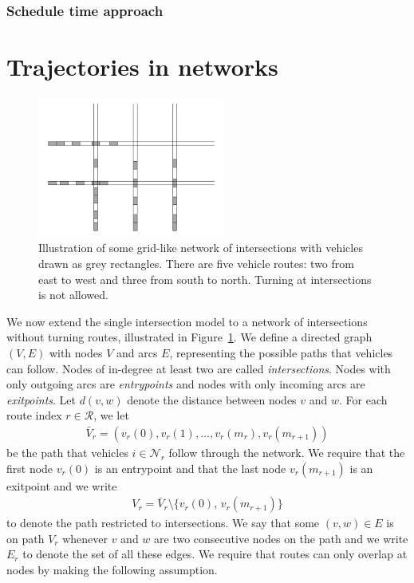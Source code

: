 \documentclass[a4paper]{article}
\theoremstyle{definition}
\theoremstyle{plain}
\begin{document}

\subsubsection{Schedule time approach}

\newpage
\section{Trajectories in networks}

\begin{figure}
  \centering
  \includegraphics[width=0.55\textwidth]{figures/network/grid_example.png}
  \caption{Illustration of some grid-like network of intersections with vehicles
    drawn as grey rectangles. There are five vehicle routes: two from east to
    west and three from south to north. Turning at intersections is not
    allowed.}\label{fig:network_illustration}
\end{figure}

We now extend the single intersection model to a network of intersections
without turning routes, illustrated in Figure~\ref{fig:network_illustration}.
We define a directed graph $(V,E)$ with nodes $V$ and arcs $E$, representing the
possible paths that vehicles can follow. Nodes of in-degree at least two are
called \textit{intersections}. Nodes with only outgoing arcs are
\textit{entrypoints} and nodes with only incoming arcs are \textit{exitpoints}.
%
Let $d(v, w)$ denote the distance between nodes $v$ and $w$.
%
For each route index $r \in \mathcal{R}$, we let
\begin{align*}
  \bar{V}_{r} = (v_{r}(0), v_{r}(1), \dots, v_{r}(m_{r}), v_{r}(m_{r+1}))
\end{align*}
be the path that vehicles $i \in \mathcal{N}_{r}$ follow through the network. We
require that the first node $v_{r}(0)$ is an entrypoint and that the last node
$v_{r}(m_{r+1})$ is an exitpoint and we write
\begin{align*}
  V_{r} = \bar{V}_{r} \setminus \{ v_{r}(0), \, v_{r}(m_{r+1}) \}
\end{align*}
to denote the path restricted to intersections. We say that some $(v, w) \in E$
is on path $V_{r}$ whenever $v$ and $w$ are two consecutive nodes on the path
and we write $E_{r}$ to denote the set of all these edges. We require that
routes can only overlap at nodes by making the following assumption.
\end{document}

